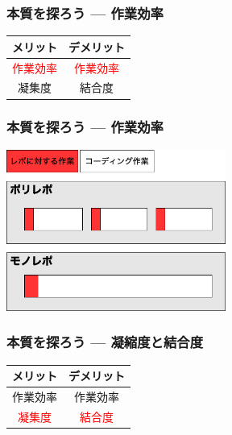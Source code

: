 \begin{frame}
    \frametitle{本質を探ろう --- 作業効率}
    \begin{block}{}
        \centering
        \begin{tabular}{cc}
            \toprule
            メリット & デメリット \\
            \midrule
            \textcolor{red}{作業効率} & \textcolor{red}{作業効率} \\
            凝集度 & 結合度 \\
            \bottomrule
        \end{tabular}
    \end{block}
\end{frame}

\begin{frame}
    \frametitle{本質を探ろう --- 作業効率}
    \centering\includegraphics[height=150pt]{efficiency.png}
\end{frame}

\begin{frame}
    \frametitle{本質を探ろう --- 凝縮度と結合度}
    \begin{block}{}
        \centering
        \begin{tabular}{cc}
            \toprule
            メリット & デメリット \\
            \midrule
            作業効率 & 作業効率 \\
            \textcolor{red}{凝集度} & \textcolor{red}{結合度} \\
            \bottomrule
        \end{tabular}
    \end{block}
\end{frame}

